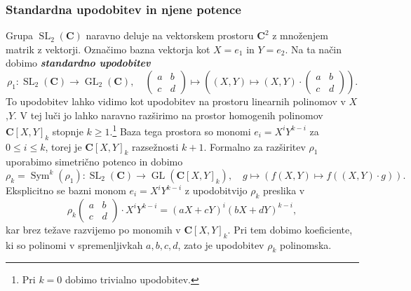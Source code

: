 \documentclass[11pt]{book}
\def\CC{\mathbf{C}}
\DeclareMathOperator\GL{GL}
\DeclareMathOperator\SL{SL}
\DeclareMathOperator\Sym{Sym}
\def\definicija{\color{rdeca}\bf\em}
\theoremstyle{definition}
\theoremstyle{zgled}
\theoremstyle{odprtproblem}
\theoremstyle{domacanaloga}
\theoremstyle{izrek}
\begin{document}
\subsubsection{Standardna upodobitev in njene potence}

Grupa $\SL_2(\CC)$ naravno deluje na vektorskem prostoru $\CC^2$ z množenjem matrik z vektorji. Označimo bazna vektorja kot $X = e_1$ in $Y = e_2$. Na ta način dobimo {\definicija standardno upodobitev}
\[
    \rho_1 \colon {\textstyle \SL_2(\CC) \to \GL_2(\CC)}, \quad
    \begin{pmatrix}
        a & b \\ c & d 
    \end{pmatrix}
    \mapsto \left( (X,Y) \mapsto (X,Y) \cdot \begin{pmatrix}
        a & b \\ c & d 
    \end{pmatrix} \right).
\]
To upodobitev lahko vidimo kot upodobitev na prostoru linearnih polinomov v $X$,$Y$. V tej luči jo lahko naravno razširimo na prostor homogenih polinomov $\CC[X,Y]_k$ stopnje $k \geq 1$.\footnote{Pri $k = 0$ dobimo trivialno upodobitev.} Baza tega prostora so monomi $e_i = X^i Y^{k-i}$ za $0 \leq i \leq k$, torej je $\CC[X,Y]_k$ razsežnosti $k+1$. Formalno za razširitev $\rho_1$ uporabimo simetrično potenco in dobimo
\[
    {\textstyle \rho_k = \Sym^k(\rho_1) \colon \SL_2(\CC) \to \GL(\CC[X,Y]_k),} \quad
    g \mapsto \left( f(X,Y) \mapsto f((X,Y) \cdot g) \right).
\]
Eksplicitno se bazni monom $e_i = X^i Y^{k-i}$ z upodobitvijo $\rho_k$ preslika v
\[
    \rho_k \begin{pmatrix}
        a & b \\ c & d 
    \end{pmatrix}
    \cdot X^i Y^{k-i}
    = (aX + cY)^i (bX + dY)^{k-i},
\]
kar brez težave razvijemo po monomih v $\CC[X,Y]_k$. Pri tem dobimo koeficiente, ki so polinomi v spremenljivkah $a,b,c,d$, zato je upodobitev $\rho_k$ polinomska.
\end{document}
